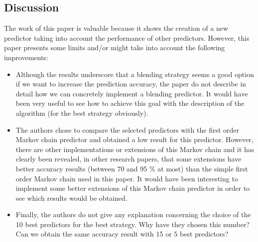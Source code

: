 \subsection{Discussion} \label{lect5-disc}

The work of this paper is valuable because it shows the creation of a new predictor taking into account the performance of other predictors. However, this paper presents some limits and/or might take into account the following improvements:

\begin{itemize}

\item Although the results underscore that a blending strategy seems a good option if we want to increase the prediction accuracy, the paper do not describe in detail how we can concretely implement a blending predictor. It would have been very useful to see how to achieve this goal with the description of the algorithm (for the best strategy obviously).

\item The authors chose to compare the selected predictors with the first order Markov chain predictor and obtained a low result for this predictor. However, there are other implementations or extensions of this Markov chain and it has clearly been revealed, in other research papers, that some extensions have better accuracy results (between 70 and 95 \% at most) than the simple first order Markov chain used in this paper. It would have been interesting to implement some better extensions of this Markov chain predictor in order to see which results would be obtained.

\item Finally, the authors do not give any explanation concerning the choice of the 10 best predictors for the best strategy. Why have they chosen this number? Can we obtain the same accuracy result with 15 or 5 best predictors?

\end{itemize}